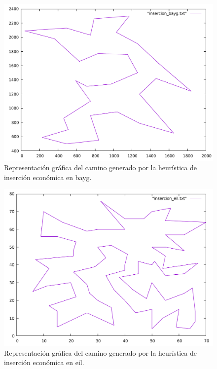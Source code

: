 \begin{figure}[H]
  \centering
  \includegraphics[scale=0.5]{../src/insercion_bayg.pdf}
  \caption{Representación gráfica del camino generado por la heurística de inserción económica en bayg.}
\end{figure} 

\begin{figure}[H]
  \centering
  \includegraphics[scale=0.5]{../src/insercion_eil.pdf}
  \caption{Representación gráfica del camino generado por la heurística de inserción económica en eil.}
\end{figure}

